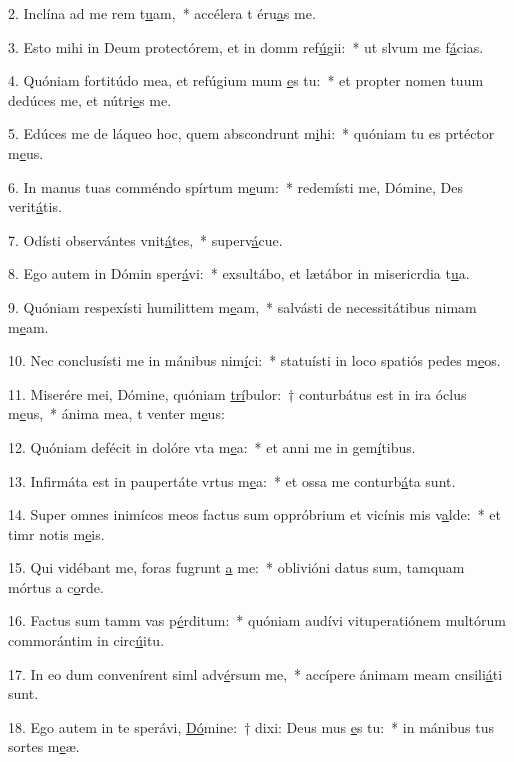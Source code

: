 2. Inclína ad me rem t\uline{u}am,~* accélera t éru\uline{a}s me.\par 
3. Esto mihi in Deum protectórem, et in domm ref\uline{ú}gii:~* ut slvum me f\uline{á}cias.\par 
4. Quóniam fortitúdo mea, et refúgium mum \uline{e}s tu:~* et propter nomen tuum dedúces me, et nútri\uline{e}s me.\par 
5. Edúces me de láqueo hoc, quem abscondrunt m\uline{i}hi:~* quóniam tu es prtéctor m\uline{e}us.\par 
6. In manus tuas comméndo spírtum m\uline{e}um:~* redemísti me, Dómine, Des verit\uline{á}tis.\par 
7. Odísti observántes vnit\uline{á}tes,~* superv\uline{á}cue.\par 
8. Ego autem in Dómin sper\uline{á}vi:~* exsultábo, et lætábor in misericrdia t\uline{u}a.\par 
9. Quóniam respexísti humilittem m\uline{e}am,~* salvásti de necessitátibus nimam m\uline{e}am.\par 
10. Nec conclusísti me in mánibus nim\uline{í}ci:~* statuísti in loco spatiós pedes m\uline{e}os.\par 
11. Miserére mei, Dómine, quóniam \uline{trí}bulor:~† conturbátus est in ira óclus m\uline{e}us,~* ánima mea, t venter m\uline{e}us:\par 
12. Quóniam defécit in dolóre vta m\uline{e}a:~* et anni me in gem\uline{í}tibus.\par 
13. Infirmáta est in paupertáte vrtus m\uline{e}a:~* et ossa me conturb\uline{á}ta sunt.\par 
14. Super omnes inimícos meos factus sum oppróbrium et vicínis mis v\uline{a}lde:~* et timr notis m\uline{e}is.\par 
15. Qui vidébant me, foras fugrunt \uline{a} me:~* oblivióni datus sum, tamquam mórtus a c\uline{o}rde.\par 
16. Factus sum tamm vas p\uline{é}rditum:~* quóniam audívi vituperatiónem multórum commorántim in circ\uline{ú}itu.\par 
17. In eo dum convenírent siml adv\uline{é}rsum me,~* accípere ánimam meam cnsili\uline{á}ti sunt.\par 
18. Ego autem in te sperávi, \uline{Dó}mine:~† dixi: Deus mus \uline{e}s tu:~* in mánibus tus sortes m\uline{e}æ.\par 
